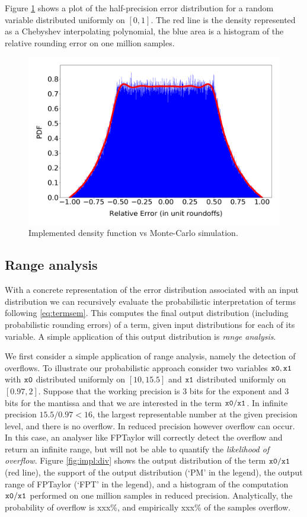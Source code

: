 \documentclass[10pt,conference]{IEEEtran}
\begin{document}
Figure \ref{fig:impl:errdist} shows a plot of the half-precision error distribution for a random variable distributed uniformly on $\left[0,1\right]$. The red line is the density represented as a Chebyshev interpolating polynomial, the blue area is a histogram of the relative rounding error on one million samples.

\begin{figure}[h!]
\includegraphics[scale=0.22]{pics/Relative_Error_Distribution}
\caption{Implemented density function vs Monte-Carlo simulation.}
\label{fig:impl:errdist}
\end{figure}

\subsection{Range analysis}
With a concrete representation of the error distribution associated with an input distribution we can recursively evaluate the probabilistic interpretation of terms following \eqref{eq:termsem}. This computes the final output distribution (including probabilistic rounding errors) of a term, given input distributions for each of its variable. A simple application of this output distribution is \emph{range analysis}. 

We first consider a simple application of range analysis, namely the detection of overflows. To illustrate our probabilistic approach consider two variables $\tt x0, x1$ with $\tt x0$ distributed uniformly on $\left[10, 15.5\right]$ and $\tt x1$ distributed uniformly on $\left[0.97,2\right]$. Suppose that the working precision is 3 bits for the exponent and 3 bits for the mantissa and that we are interested in the term $\tt x0/x1$. In infinite precision $15.5/0.97 < 16$, the largest representable number at the given precision level, and there is no overflow. In reduced precision however overflow can occur. In this case, an analyser like FPTaylor will correctly detect the overflow and return an infinite range, but will not be able to quantify the \emph{likelihood of overflow}. Figure \ref{fig:impl:div} shows the output distribution of the term $\tt x0/x1$ (red line), the support of the output distribution (`PM' in the legend), the output range of FPTaylor (`FPT' in the legend), and a histogram of the computation $\tt x0/x1$ performed on one million samples in reduced precision. Analytically, the probability of overflow is xxx\%, and empirically xxx\% of the samples overflow.
\end{document}
